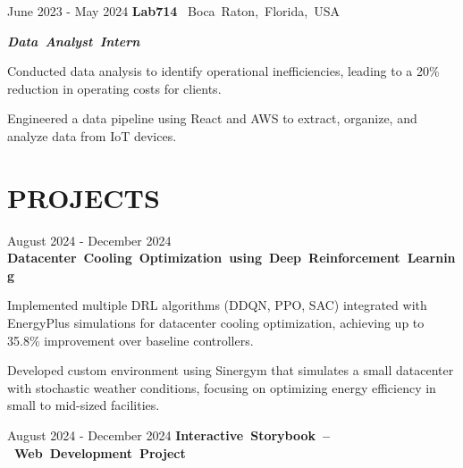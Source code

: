 \documentclass[10pt, letterpaper]{article}
\begin{document}
\vspace{\entrySpacing}
\begin{twocolentry}{June 2023 - May 2024}
    \mbox{\textbf{Lab714}
        \kern {}
        \AND
        \kern {}}
    \mbox{Boca Raton, Florida, USA}
\end{twocolentry}

\mbox{\textbf{\textsl{Data Analyst Intern}}}
\begin{onecolentry}
    \begin{highlightsforbulletentries}
        \item Conducted data analysis to identify operational inefficiencies, leading to a 20\% reduction in operating costs for clients.
        \item Engineered a data pipeline using React and AWS to extract, organize, and analyze data from IoT devices.
    \end{highlightsforbulletentries}
\end{onecolentry}

\vspace{\headerSpacing}
\section{PROJECTS}

\vspace{\entrySpacing}
\begin{twocolentry}{August 2024 - December 2024}
    \mbox{\textbf{Datacenter Cooling Optimization using Deep Reinforcement Learning}}
\end{twocolentry}

\begin{onecolentry}
    \begin{highlightsforbulletentries}
        \item Implemented multiple DRL algorithms (DDQN, PPO, SAC) integrated with EnergyPlus simulations for datacenter cooling optimization, achieving up to 35.8\% improvement over baseline controllers.
        \item Developed custom environment using Sinergym that simulates a small datacenter with stochastic weather conditions, focusing on optimizing energy efficiency in small to mid-sized facilities.
    \end{highlightsforbulletentries}
\end{onecolentry}

\vspace{\entrySpacing}
\begin{twocolentry}{August 2024 - December 2024}
    \mbox{\textbf{Interactive Storybook -- Web Development Project}}
\end{twocolentry}
\end{document}
